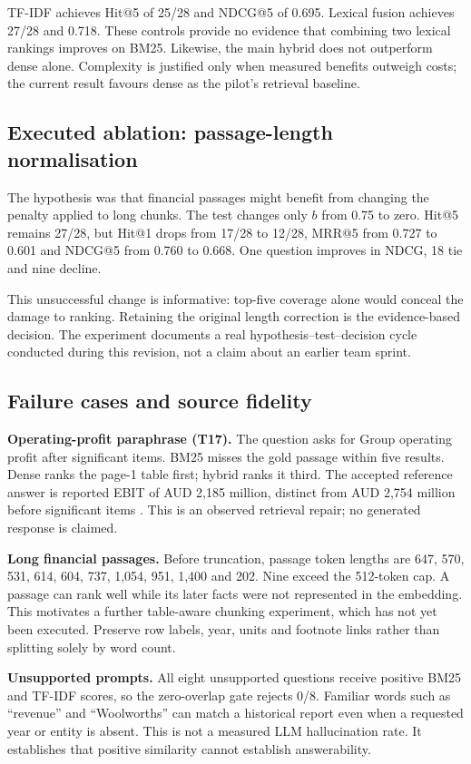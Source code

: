 \documentclass[11pt,a4paper]{article}
\begin{document}
TF-IDF achieves Hit@5 of 25/28 and NDCG@5 of 0.695. Lexical fusion achieves 27/28 and 0.718. These controls provide no evidence that combining two lexical rankings improves on BM25. Likewise, the main hybrid does not outperform dense alone. Complexity is justified only when measured benefits outweigh costs; the current result favours dense as the pilot's retrieval baseline.

\subsection{Executed ablation: passage-length normalisation}
The hypothesis was that financial passages might benefit from changing the penalty applied to long chunks. The test changes only $b$ from 0.75 to zero. Hit@5 remains 27/28, but Hit@1 drops from 17/28 to 12/28, MRR@5 from 0.727 to 0.601 and NDCG@5 from 0.760 to 0.668. One question improves in NDCG, 18 tie and nine decline.

This unsuccessful change is informative: top-five coverage alone would conceal the damage to ranking. Retaining the original length correction is the evidence-based decision. The experiment documents a real hypothesis--test--decision cycle conducted during this revision, not a claim about an earlier team sprint.

\subsection{Failure cases and source fidelity}
\textbf{Operating-profit paraphrase (T17).} The question asks for Group operating profit after significant items. BM25 misses the gold passage within five results. Dense ranks the page-1 table first; hybrid ranks it third. The accepted reference answer is reported EBIT of AUD 2,185 million, distinct from AUD 2,754 million before significant items \cite{summary}. This is an observed retrieval repair; no generated response is claimed.

\textbf{Long financial passages.} Before truncation, passage token lengths are 647, 570, 531, 614, 604, 737, 1,054, 951, 1,400 and 202. Nine exceed the 512-token cap. A passage can rank well while its later facts were not represented in the embedding. This motivates a further table-aware chunking experiment, which has not yet been executed. Preserve row labels, year, units and footnote links rather than splitting solely by word count.

\textbf{Unsupported prompts.} All eight unsupported questions receive positive BM25 and TF-IDF scores, so the zero-overlap gate rejects 0/8. Familiar words such as ``revenue'' and ``Woolworths'' can match a historical report even when a requested year or entity is absent. This is not a measured LLM hallucination rate. It establishes that positive similarity cannot establish answerability.
\end{document}
